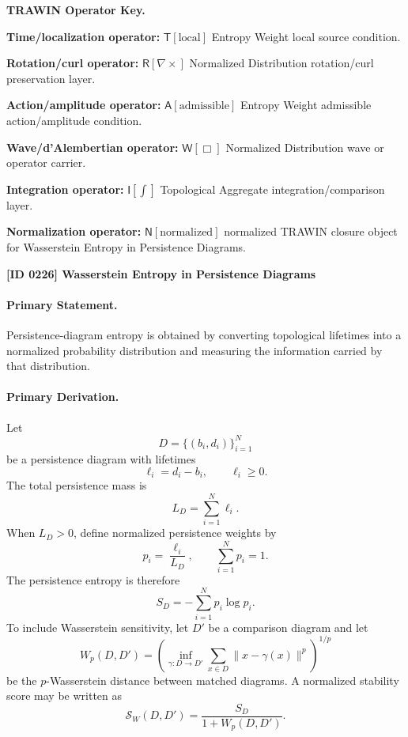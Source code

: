 \par\vspace{0.45\baselineskip}
\noindent\begin{minipage}[t]{\linewidth}
\begingroup
\small
\raggedright
\textbf{TRAWIN Operator Key.}\par
\noindent\textbf{Time/localization operator:} $\mathsf{T}\!\left[\mathrm{local}\right]$ Entropy Weight local source condition.\par
\noindent\textbf{Rotation/curl operator:} $\mathsf{R}\!\left[\nabla\times\right]$ Normalized Distribution rotation/curl preservation layer.\par
\noindent\textbf{Action/amplitude operator:} $\mathsf{A}\!\left[\mathrm{admissible}\right]$ Entropy Weight admissible action/amplitude condition.\par
\noindent\textbf{Wave/d'Alembertian operator:} $\mathsf{W}\!\left[\Box\right]$ Normalized Distribution wave or operator carrier.\par
\noindent\textbf{Integration operator:} $\mathsf{I}\!\left[\int\right]$ Topological Aggregate integration/comparison layer.\par
\noindent\textbf{Normalization operator:} $\mathsf{N}\!\left[\mathrm{normalized}\right]$ normalized TRAWIN closure object for Wasserstein Entropy in Persistence Diagrams.\par
\endgroup
\end{minipage}

\clearpage
\noindent\textbf{[ID 0226] Wasserstein Entropy in Persistence Diagrams}\par
\vspace{0.35em}
\paragraph{Primary Statement.}

Persistence-diagram entropy is obtained by converting topological lifetimes into a normalized probability distribution and measuring the information carried by that distribution.

\paragraph{Primary Derivation.}

Let
\[
D=\{(b_i,d_i)\}_{i=1}^{N}
\]
be a persistence diagram with lifetimes
\[
\ell_i=d_i-b_i,\qquad \ell_i\ge 0.
\]
The total persistence mass is
\[
L_D=\sum_{i=1}^{N}\ell_i.
\]
When \(L_D>0\), define normalized persistence weights by
\[
p_i=\frac{\ell_i}{L_D},\qquad \sum_{i=1}^{N}p_i=1.
\]
The persistence entropy is therefore
\begin{equation}
S_D=-\sum_{i=1}^{N}p_i\log p_i.
\end{equation}
To include Wasserstein sensitivity, let \(D'\) be a comparison diagram and let
\[
W_p(D,D')=\left(\inf_{\gamma:D\to D'}\sum_{x\in D}\|x-\gamma(x)\|^{p}\right)^{1/p}
\]
be the \(p\)-Wasserstein distance between matched diagrams. A normalized stability score may be written as
\[
\mathcal{S}_{W}(D,D')=\frac{S_D}{1+W_p(D,D')}.
\]

